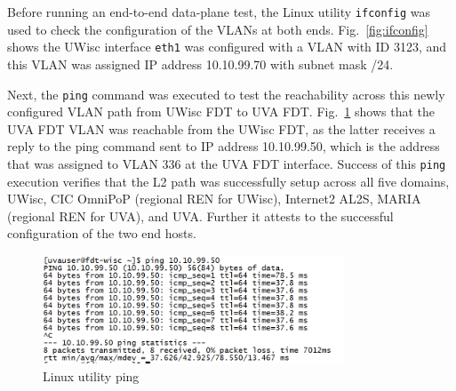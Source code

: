 Before running an end-to-end data-plane test, the Linux utility \texttt{ifconfig} was used to check the configuration of the VLANs at both ends. Fig.~\ref{fig:ifconfig} shows the UWisc interface \texttt{eth1} was configured with a VLAN with ID 3123, and this VLAN was
 assigned IP address 10.10.99.70 with subnet mask /24.

Next, the \texttt{ping} command was executed to test the reachability across this newly configured VLAN path from UWisc FDT to UVA FDT.
 Fig.~\ref{fig:ping} shows that the UVA FDT VLAN was reachable from the UWisc FDT,
 as the latter receives a reply to the ping command sent to IP address 10.10.99.50, which is
 the address that was assigned to VLAN 336 at the UVA FDT interface. Success of this
\texttt{ping} execution verifies that the L2 path was successfully setup across all five domains,
UWisc, CIC OmniPoP (regional REN for UWisc), Internet2 AL2S, MARIA (regional REN for UVA),
and UVA. Further it attests to the successful configuration of the two end hosts.

\begin{figure}[htb!]
\centering
\includegraphics[width=0.8\textwidth]{figures/ping.png}
\caption{Linux utility ping}
\label{fig:ping}
\end{figure}

